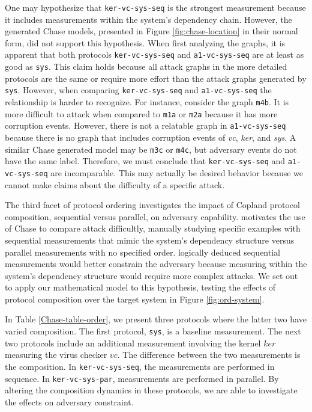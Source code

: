 \documentclass[runningheads]{llncs}
\theoremstyle{definition}
\begin{document}
One may hypothesize that \texttt{ker-vc-sys-seq} is the strongest measurement because it includes measurements within the system's dependency chain. However, the generated Chase models, presented in Figure \ref{fig:chase-location} in their normal form, did not support this hypothesis. When first analyzing the graphs, it is apparent that both protocols \texttt{ker-vc-sys-seq} and \texttt{a1-vc-sys-seq} are at least as good as \texttt{sys}. This claim holds because all attack graphs in the more detailed protocols are the same or require more effort than the attack graphs generated by \texttt{sys}. However, when comparing \texttt{ker-vc-sys-seq} and \texttt{a1-vc-sys-seq} the relationship is harder to recognize. For instance, consider the graph \texttt{m4b}. It is more difficult to attack when compared to \texttt{m1a} or \texttt{m2a} because it has more corruption events. However, there is not a relatable graph in \texttt{a1-vc-sys-seq} because there is no graph that includes corruption events of \emph{vc}, \emph{ker}, and \emph{sys}. A similar Chase generated model may be \texttt{m3c} or \texttt{m4c}, but adversary events do not have the same label. Therefore, we must conclude that  \texttt{ker-vc-sys-seq} and \texttt{a1-vc-sys-seq} are incomparable. This may actually be desired behavior because we cannot make claims about the difficulty of a specific attack. 


The third facet of protocol ordering investigates the impact of Copland protocol composition, sequential versus parallel, on adversary capability. \citet{Rowe:2021:AutomatedTrust} motivates the use of Chase to compare attack difficultly, manually studying specific examples with sequential measurements that mimic the system's dependency structure versus parallel measurements with no specified order. \citet{Rowe:2021:AutomatedTrust} logically deduced sequential measurements would better constrain the adversary because measuring within the system's dependency structure would require more complex attacks. We set out to apply our mathematical model to this hypothesis, testing the effects of protocol composition over the target system in Figure \ref{fig:ord-system}. 

In Table \ref{Chase-table-order}, we present three protocols where the latter two have varied composition. The first protocol, \texttt{sys}, is a baseline measurement. The next two protocols include an additional measurement involving the kernel $ker$ measuring the virus checker $vc$. The difference between the two measurements is the composition. In \texttt{ker-vc-sys-seq}, the measurements are performed in sequence. In \texttt{ker-vc-sys-par}, measurements are performed in parallel. By altering the composition dynamics in these protocols, we are able to investigate the effects on adversary constraint.
\end{document}

